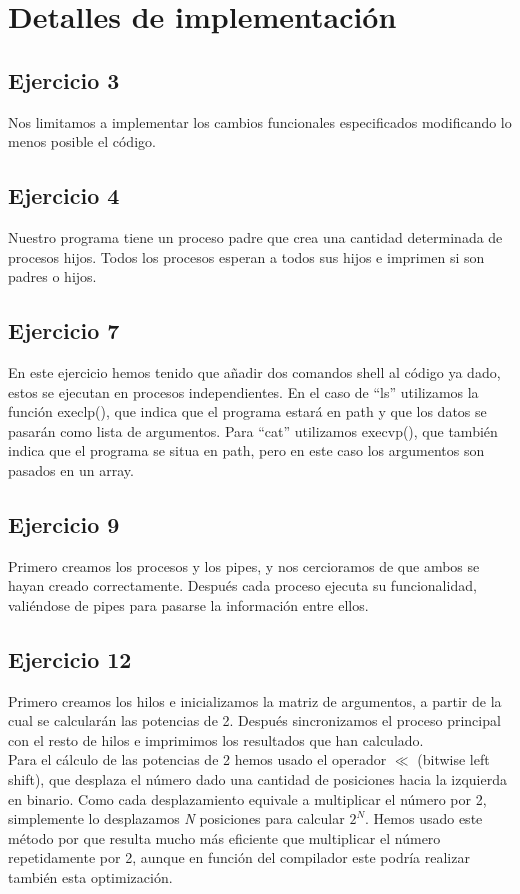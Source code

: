 \documentclass[]{article}
\begin{document}
\section*{Detalles de implementación}
\subsection*{Ejercicio 3}
Nos limitamos a implementar los cambios funcionales especificados modificando lo menos posible el código.

\subsection*{Ejercicio 4}
Nuestro programa tiene un proceso padre que crea una cantidad determinada de procesos hijos. Todos los procesos esperan a todos sus hijos e imprimen si son padres o hijos.

\subsection*{Ejercicio 7}
En este ejercicio hemos tenido que añadir dos comandos shell al código ya dado, estos se ejecutan en procesos independientes. En el caso de ``ls'' utilizamos la función execlp(), que indica que el programa estará en path y que los datos se pasarán como lista de argumentos. Para ``cat'' utilizamos execvp(), que también indica que el programa se situa en path, pero en este caso los argumentos son pasados en un array.

\subsection*{Ejercicio 9}
Primero creamos los procesos y los pipes, y nos cercioramos de que ambos se hayan creado correctamente. Después cada proceso ejecuta su funcionalidad, valiéndose de pipes para pasarse la información entre ellos.

\subsection*{Ejercicio 12}
Primero creamos los hilos e inicializamos la matriz de argumentos, a partir de la cual se calcularán las potencias de 2. Después sincronizamos el proceso principal con el resto de hilos e imprimimos los resultados que han calculado. \\
Para el cálculo de las potencias de 2 hemos usado el operador $\ll$ (bitwise left shift), que desplaza el número dado una cantidad de posiciones hacia la izquierda en binario. Como cada desplazamiento equivale a multiplicar el número por 2, simplemente lo desplazamos \textit{N} posiciones para calcular \textit{$2^N$}. Hemos usado este método por que resulta mucho más eficiente que multiplicar el número repetidamente por 2, aunque en función del compilador este podría realizar también esta optimización.
\end{document}
